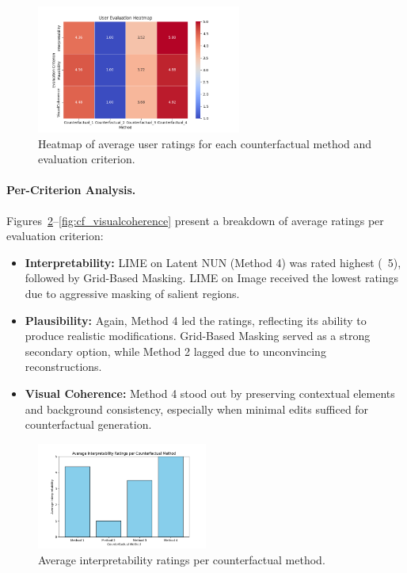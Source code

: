 \begin{figure}[htbp]
    \centering
    \includegraphics[width=0.6\textwidth]{img/human_rating_results/heatmap_user_evaluations.png}
    \caption{Heatmap of average user ratings for each counterfactual method and evaluation criterion.}
    \label{fig:heatmap_user_eval}
\end{figure}

\vspace{0.5em}
\paragraph{Per-Criterion Analysis.}
Figures~\ref{fig:cf_interpretability}--\ref{fig:cf_visualcoherence} present a breakdown of average ratings per evaluation criterion:

\begin{itemize}
    \item \textbf{Interpretability:} LIME on Latent NUN (Method 4) was rated highest (~5), followed by Grid-Based Masking. LIME on Image received the lowest ratings due to aggressive masking of salient regions.
    \item \textbf{Plausibility:} Again, Method 4 led the ratings, reflecting its ability to produce realistic modifications. Grid-Based Masking served as a strong secondary option, while Method 2 lagged due to unconvincing reconstructions.
    \item \textbf{Visual Coherence:} Method 4 stood out by preserving contextual elements and background consistency, especially when minimal edits sufficed for counterfactual generation.
\end{itemize}

\begin{figure}[h]
    \centering
    \includegraphics[width=0.5\textwidth]{img/human_rating_results/Interpretability_ratings.png}
    \caption{Average interpretability ratings per counterfactual method.}
    \label{fig:cf_interpretability}
\end{figure}

